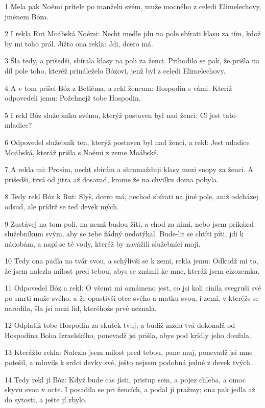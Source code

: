 \par 1 Mela pak Noémi prítele po manželu svém, muže mocného z celedi Elimelechovy, jménem Bóza.
\par 2 I rekla Rut Moábská Noémi: Necht medle jdu na pole sbírati klasu za tím, kdož by mi toho prál. Jížto ona rekla: Jdi, dcero má.
\par 3 Šla tedy, a prišedši, sbírala klasy na poli za ženci. Prihodilo se pak, že prišla na díl pole toho, kteréž prináleželo Bózovi, jenž byl z celedi Elimelechovy.
\par 4 A v tom prišel Bóz z Betléma, a rekl žencum: Hospodin s vámi. Kteríž odpovedeli jemu: Požehnejž tobe Hospodin.
\par 5 I rekl Bóz služebníku svému, kterýž postaven byl nad ženci: Cí jest tato mladice?
\par 6 Odpovedel služebník ten, kterýž postaven byl nad ženci, a rekl: Jest mladice Moábská, kteráž prišla s Noémi z zeme Moábské.
\par 7 A rekla mi: Prosím, necht sbírám a shromažduji klasy mezi snopy za ženci. A prišedši, trvá od jitra až dosavad, krome že na chvilku doma pobyla.
\par 8 Tedy rekl Bóz k Rut: Slyš, dcero má, nechod sbírati na jiné pole, aniž odcházej odsud, ale prídrž se ted devek mých.
\par 9 Zustávej na tom poli, na nemž budou žíti, a chod za nimi, nebo jsem prikázal služebníkum svým, aby se tebe žádný nedotýkal. Bude-lit se chtíti píti, jdi k nádobám, a napí se té vody, kteréž by navážili služebníci moji.
\par 10 Tedy ona padla na tvár svou, a schýlivši se k zemi, rekla jemu: Odkudž mi to, že jsem nalezla milost pred tebou, abys se známil ke mne, kteráž jsem cizozemka.
\par 11 Odpovedel Bóz a rekl: O všemt mi oznámeno jest, co jsi koli cinila svegruši své po smrti muže svého, a že opustivši otce svého a matku svou, i zemi, v kteréžs se narodila, šla jsi mezi lid, kteréhožs prvé neznala.
\par 12 Odplatiž tobe Hospodin za skutek tvuj, a budiž mzda tvá dokonalá od Hospodina Boha Izraelského, ponevadž jsi prišla, abys pod krídly jeho doufala.
\par 13 Kterážto rekla: Nalezla jsem milost pred tebou, pane muj, ponevadž jsi mne potešil, a mluvils k srdci devky své, ješto nejsem podobná jedné z devek tvých.
\par 14 Tedy rekl jí Bóz: Když bude cas jísti, pristup sem, a pojez chleba, a omoc skyvu svou v octe. I posadila se pri žencích, a podal jí pražmy; ona pak jedla až do sytosti, a ješte jí zbylo.

